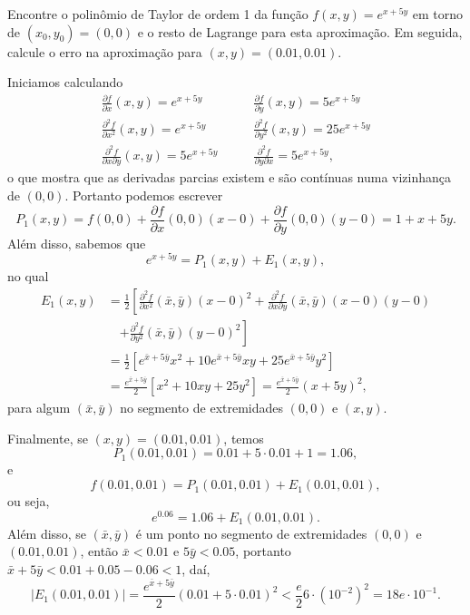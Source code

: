 \begin{example}
    Encontre o polinômio de Taylor de ordem 1 da função \(f(x,y) = e^{x+5y}\) em torno de \((x_0,y_0) = (0,0)\) e o resto de Lagrange para esta aproximação. Em seguida, calcule o erro na aproximação para \((x,y) = (0.01,0.01)\).

    Iniciamos calculando
        \begin{align*}
            \frac{\partial f}{\partial x}(x,y) = e^{x+5y} \quad & \quad \frac{\partial f}{\partial y}(x,y) = 5e^{x+5y} \\
            \frac{\partial^2 f}{\partial x^2}(x,y) = e^{x+5y} \quad & \quad \frac{\partial^2 f}{\partial y^2}(x,y) = 25e^{x+5y} \\
            \frac{\partial^2 f}{\partial x \partial y}(x,y) = 5e^{x+5y} \quad & \quad  \frac{\partial^2 f}{\partial y \partial x} = 5e^{x+5y},
        \end{align*}
    o que mostra que as derivadas parcias existem e são contínuas numa vizinhança de \((0,0)\). Portanto podemos escrever \[P_1(x,y) = f(0,0) + \frac{\partial f}{\partial x}(0,0)(x-0) + \frac{\partial f}{\partial y}(0,0)(y-0) = 1 + x + 5y.\] Além disso, sabemos que \[e^{x+5y} = P_1(x,y) + E_1(x,y),\] no qual
        \begin{align*}
            E_1(x,y)
                & = \frac{1}{2}\left[ \frac{\partial^2 f}{\partial x^2}(\bar{x},\bar{y})(x-0)^2 + \frac{\partial^2 f}{\partial x \partial y}(\bar{x},\bar{y})(x-0)(y-0) \right. \\
                    &\quad \left. + \frac{\partial^2 f}{\partial y^2}(\bar{x},\bar{y})(y-0)^2 \right] \\
                & = \frac{1}{2}\left[ e^{\bar{x}+5\bar{y}}x^2 + 10e^{\bar{x}+5\bar{y}}xy + 25e^{\bar{x}+5\bar{y}}y^2 \right] \\
                & = \frac{e^{\bar{x}+5\bar{y}}}{2}[x^2 + 10xy + 25y^2] = \frac{e^{\bar{x}+5\bar{y}}}{2}(x+5y)^2,
        \end{align*}
    para algum \((\bar{x},\bar{y})\) no segmento de extremidades \((0,0)\) e \((x,y)\).

    Finalmente, se \((x,y) = (0.01,0.01)\), temos \[P_1(0.01,0.01) = 0.01 + 5\cdot0.01 + 1 = 1.06,\] e \[f(0.01,0.01) = P_1(0.01,0.01) + E_1(0.01,0.01),\] ou seja, \[e^{0.06} = 1.06 + E_1(0.01,0.01).\] Além disso, se \((\bar{x},\bar{y})\) é um ponto no segmento de extremidades \((0,0)\) e \((0.01,0.01)\), então \(\bar{x} < 0.01\) e \(5\bar{y} < 0.05\), portanto \(\bar{x} + 5\bar{y} < 0.01 + 0.05 - 0.06 < 1\), daí, \[|E_1(0.01,0.01)| = \frac{e^{\bar{x}+5\bar{y}}}{2} (0.01 + 5\cdot0.01)^2 < \frac{e}{2} 6\cdot (10^{-2})^2 = 18e\cdot 10^{-1}.\]
\end{example}

